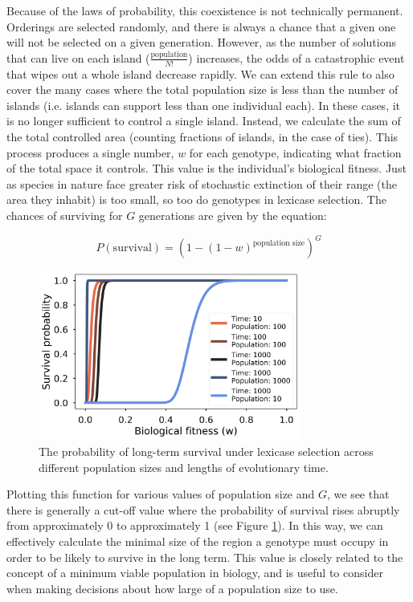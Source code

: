 Because of the laws of probability, this coexistence is not technically permanent. Orderings are selected randomly, and there is always a chance that a given one will not be selected on a given generation. However, as the number of solutions that can live on each island ($\frac{\text{population}}{N!}$) increases, the odds of a catastrophic event that wipes out a whole island decrease rapidly. We can extend this rule to also cover the many cases where the total population size is less than the number of islands (i.e. islands can support less than one individual each). In these cases, it is no longer sufficient to control a single island. Instead, we calculate the sum of the total controlled area (counting fractions of islands, in the case of ties). This process produces a single number, $w$ for each genotype, indicating what fraction of the total space it controls. This value is the individual's biological fitness. Just as species in nature face greater risk of stochastic extinction of their range (the area they inhabit) is too small, so too do genotypes in lexicase selection. The chances of surviving for $G$ generations are given by the equation:

\begin{equation}
P(\text{survival}) = (1 - (1-w)^{\text{population size}})^{G}
\end{equation}
\begin{figure}
\includegraphics[width=3.4in]{figs/survival.png}
\caption{The probability of long-term survival under lexicase selection across different population sizes and lengths of evolutionary time.}
\label{prob_survival}
\end{figure}

Plotting this function for various values of population size and $G$, we see that there is generally a cut-off value where the probability of survival rises abruptly from approximately 0 to approximately 1 (see Figure \ref{prob_survival}). In this way, we can effectively calculate the minimal size of the region a genotype must occupy in order to be likely to survive in the long term. This value is closely related to the concept of a minimum viable population in biology, and is useful to consider when making decisions about how large of a population size to use. 

